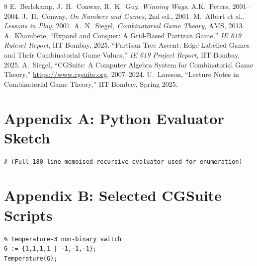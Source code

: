 \documentclass[10pt,a4paper,twocolumn]{article}
\theoremstyle{plain}
\theoremstyle{definition}
\theoremstyle{remark}
\begin{document}
\vspace{12pt}

\begin{thebibliography}{8}
 E.~Berlekamp, J.~H.~Conway, R.~K.~Guy, \textit{Winning Ways}, A.K.~Peters, 2001--2004.
 J.~H.~Conway, \textit{On Numbers and Games}, 2nd ed., 2001.
 M.~Albert et al., \textit{Lessons in Play}, 2007.
 A.~N.~Siegel, \textit{Combinatorial Game Theory}, AMS, 2013.
 A.~Khambete, ``Expand and Conquer: A Grid-Based Partizan Game,'' \textit{IE 619 Ruleset Report}, IIT Bombay, 2025.
 ``Partisan Tree Ascent: Edge-Labelled Games and Their Combinatorial Game Values,'' \textit{IE 619 Project Report}, IIT Bombay, 2025.
 A.~Siegel, ``CGSuite: A Computer Algebra System for Combinatorial Game Theory,'' \url{https://www.cgsuite.org}, 2007--2024.
 U.~Larsson, ``Lecture Notes in Combinatorial Game Theory,'' IIT Bombay, Spring 2025.
\end{thebibliography}

\appendix
\section{Appendix A: Python Evaluator Sketch}
\begin{verbatim}
# (Full 180-line memoised recursive evaluator used for enumeration)
\end{verbatim}

\section{Appendix B: Selected CGSuite Scripts}
\begin{verbatim}
% Temperature-3 non-binary switch
G := {1,1,1,1 | -1,-1,-1};
Temperature(G);
\end{verbatim}
\end{document}

